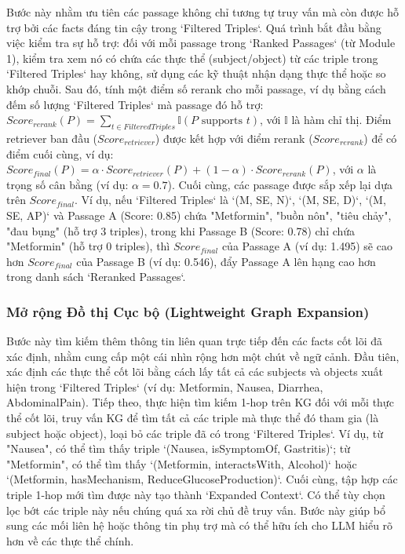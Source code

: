 \documentclass[../main.tex]{subfiles}
\begin{document}
Bước này nhằm ưu tiên các passage không chỉ tương tự truy vấn mà còn được hỗ trợ bởi các facts đáng tin cậy trong `Filtered Triples`. Quá trình bắt đầu bằng việc kiểm tra sự hỗ trợ: đối với mỗi passage trong `Ranked Passages` (từ Module 1), kiểm tra xem nó có chứa các thực thể (subject/object) từ các triple trong `Filtered Triples` hay không, sử dụng các kỹ thuật nhận dạng thực thể hoặc so khớp chuỗi. Sau đó, tính một điểm số rerank cho mỗi passage, ví dụ bằng cách đếm số lượng `Filtered Triples` mà passage đó hỗ trợ: $Score_{rerank}(P) = \sum_{t \in FilteredTriples} \mathbb{I}(P \text{ supports } t)$, với $\mathbb{I}$ là hàm chỉ thị. Điểm retriever ban đầu ($Score_{retriever}$) được kết hợp với điểm rerank ($Score_{rerank}$) để có điểm cuối cùng, ví dụ: $Score_{final}(P) = \alpha \cdot Score_{retriever}(P) + (1-\alpha) \cdot Score_{rerank}(P)$, với $\alpha$ là trọng số cân bằng (ví dụ: $\alpha=0.7$). Cuối cùng, các passage được sắp xếp lại dựa trên $Score_{final}$. Ví dụ, nếu `Filtered Triples` là {`(M, SE, N)`, `(M, SE, D)`, `(M, SE, AP)`} và Passage A (Score: 0.85) chứa "Metformin", "buồn nôn", "tiêu chảy", "đau bụng" (hỗ trợ 3 triples), trong khi Passage B (Score: 0.78) chỉ chứa "Metformin" (hỗ trợ 0 triples), thì $Score_{final}$ của Passage A (ví dụ: 1.495) sẽ cao hơn $Score_{final}$ của Passage B (ví dụ: 0.546), đẩy Passage A lên hạng cao hơn trong danh sách `Reranked Passages`.

\subsubsection{Mở rộng Đồ thị Cục bộ (Lightweight Graph Expansion)}

Bước này tìm kiếm thêm thông tin liên quan trực tiếp đến các facts cốt lõi đã xác định, nhằm cung cấp một cái nhìn rộng hơn một chút về ngữ cảnh. Đầu tiên, xác định các thực thể cốt lõi bằng cách lấy tất cả các subjects và objects xuất hiện trong `Filtered Triples` (ví dụ: {Metformin, Nausea, Diarrhea, AbdominalPain}). Tiếp theo, thực hiện tìm kiếm 1-hop trên KG đối với mỗi thực thể cốt lõi, truy vấn KG để tìm tất cả các triple mà thực thể đó tham gia (là subject hoặc object), loại bỏ các triple đã có trong `Filtered Triples`. Ví dụ, từ "Nausea", có thể tìm thấy triple `(Nausea, isSymptomOf, Gastritis)`; từ "Metformin", có thể tìm thấy `(Metformin, interactsWith, Alcohol)` hoặc `(Metformin, hasMechanism, ReduceGlucoseProduction)`. Cuối cùng, tập hợp các triple 1-hop mới tìm được này tạo thành `Expanded Context`. Có thể tùy chọn lọc bớt các triple này nếu chúng quá xa rời chủ đề truy vấn. Bước này giúp bổ sung các mối liên hệ hoặc thông tin phụ trợ mà có thể hữu ích cho LLM hiểu rõ hơn về các thực thể chính.
\end{document}
